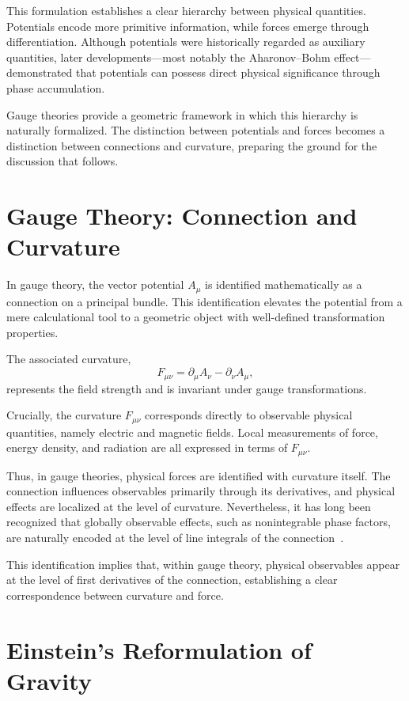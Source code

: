 \documentclass[12pt,letterpaper]{article} %
\begin{document}
This formulation establishes a clear hierarchy between physical quantities. Potentials encode more primitive information, while forces emerge through differentiation. Although potentials were historically regarded as auxiliary quantities, later developments—most notably the Aharonov--Bohm effect—demonstrated that potentials can possess direct physical significance through phase accumulation.

Gauge theories provide a geometric framework in which this hierarchy is naturally formalized. The distinction between potentials and forces becomes a distinction between connections and curvature, preparing the ground for the discussion that follows.


\section{Gauge Theory: Connection and Curvature}

\justifying
In gauge theory, the vector potential $A_\mu$ is identified mathematically as a connection on a principal bundle. This identification elevates the potential from a mere calculational tool to a geometric object with well-defined transformation properties.

The associated curvature,
\begin{equation}
F_{\mu\nu} = \partial_\mu A_\nu - \partial_\nu A_\mu,
\end{equation}
represents the field strength and is invariant under gauge transformations.

Crucially, the curvature $F_{\mu\nu}$ corresponds directly to observable physical quantities, namely electric and magnetic fields.  
Local measurements of force, energy density, and radiation are all expressed in terms of $F_{\mu\nu}$.

Thus, in gauge theories, physical forces are identified with curvature itself. The connection influences observables primarily through its derivatives, and physical effects are localized at the level of curvature. Nevertheless, it has long been recognized that globally observable effects, such as nonintegrable phase factors, are naturally encoded at the level of line integrals of the connection~\cite{WuYang}.

This identification implies that, within gauge theory, physical observables appear at the level of first derivatives of the connection, establishing a clear correspondence between curvature and force.

\section{Einstein's Reformulation of Gravity}
\end{document}
